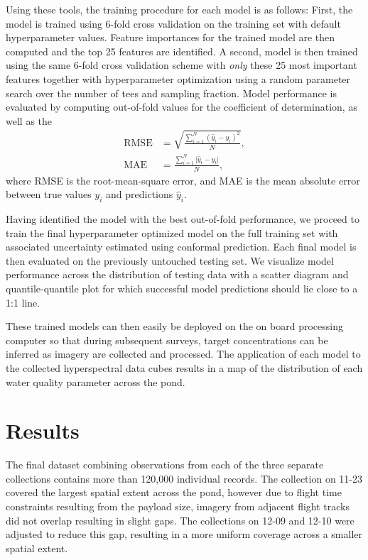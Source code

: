 \documentclass[sensors,article,submit,pdftex,moreauthors]{Definitions/mdpi}
\begin{document}
Using these tools, the training procedure for each model is as follows: First, the model is trained using 6-fold cross validation on the training set with default hyperparameter values. Feature importances for the trained model are then computed and the top 25 features are identified. A second, model is then trained using the same 6-fold cross validation scheme with \textit{only} these 25 most important features together with hyperparameter optimization using a random parameter search over the number of tees and sampling fraction. Model performance is evaluated by computing out-of-fold values for the coefficient of determination, as well as the
\begin{align}
    \text{RMSE} &= \sqrt{\frac{\sum\limits_{i=1}^N (\hat{y}_i-y_i)^2}{N}}, \\
    \text{MAE} &= \frac{\sum\limits_{i=1}^N \lvert \hat{y}_i - y_i \vert}{N},
\end{align}
where RMSE is the root-mean-square error, and MAE is the mean absolute error between true values $y_i$ and predictions $\hat{y}_i$.

Having identified the model with the best out-of-fold performance, we proceed to train the final hyperparameter optimized model on the full training set with associated uncertainty estimated using conformal prediction.  Each final model is then evaluated on the previously untouched testing set. We visualize model performance across the distribution of testing data with a scatter diagram and quantile-quantile plot for which successful model predictions should lie close to a 1:1 line.

These trained models can then easily be deployed on the on board processing computer so that during subsequent surveys, target concentrations can be inferred as imagery are collected and processed. The application of each model to the collected hyperspectral data cubes results in a map of the distribution of each water quality parameter across the pond.

\section{Results}

The final dataset combining observations from each of the three separate collections contains more than 120,000 individual records. The collection on 11-23 covered the largest spatial extent across the pond, however due to flight time constraints resulting from the payload size, imagery from adjacent flight tracks did not overlap resulting in slight gaps. The collections on 12-09 and 12-10 were adjusted to reduce this gap, resulting in a more uniform coverage across a smaller spatial extent. 
\end{document}
